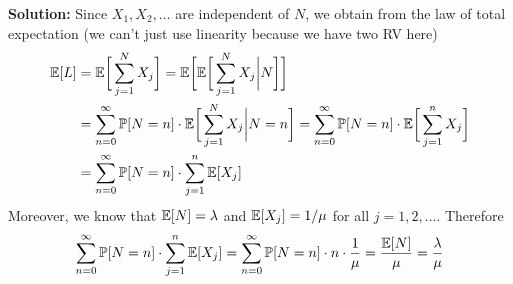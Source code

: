 \textbf{Solution:} Since $X_1, X_2, \dots$ are independent of $N$, we obtain from the law of total expectation (we can't just use linearity because we have two RV here)
\begin{align*}
    \mathbb{E}[L] &= \mathbb{E}\bigg[\sum_{j=1}^N X_j\bigg] = \mathbb{E}\bigg[\mathbb{E}\bigg[\sum_{j=1}^N X_j \bigg| N \bigg]\bigg] \\
    &= \sum_{n=0}^\infty \mathbb{P}[N=n]\cdot \mathbb{E} \bigg[\sum_{j=1}^N X_j \bigg| N=n\bigg]
     = \sum_{n=0}^\infty \mathbb{P}[N=n]\cdot\mathbb{E}\bigg[\sum_{j=1}^n X_j\bigg] \\
    &= \sum_{n=0}^\infty \mathbb{P}[N=n]\cdot\sum_{j=1}^n\mathbb{E}[X_j]
\end{align*}
Moreover, we know that $\mathbb{E}[N] = \lambda$ and $\mathbb{E}[X_j] = 1/\mu$ for all $j=1,2,\dots$. Therefore
\begin{align*}
    \sum_{n=0}^\infty\mathbb{P}[N=n]\cdot\sum_{j=1}^n \mathbb{E}[X_j] = \sum_{n=0}^\infty \mathbb{P}[N=n]\cdot n \cdot \frac{1}{\mu} = \frac{\mathbb{E}[N]}{\mu} = \frac{\lambda}{\mu}
\end{align*}